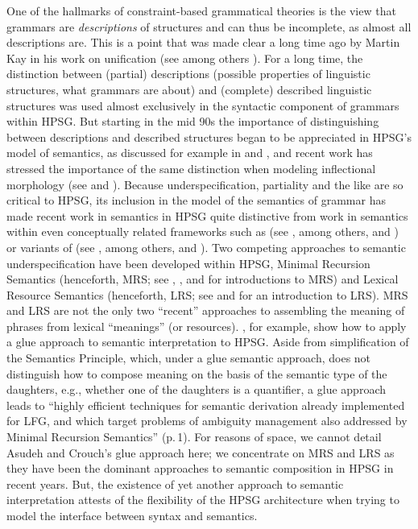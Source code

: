 \documentclass[output=paper]{langsci/langscibook}
\begin{document}
One of the hallmarks of constraint-based grammatical theories is the view that grammars are \emph{descriptions} of structures and can thus be incomplete, as almost all descriptions are. This is a point that was made clear a long time ago by Martin Kay in his work on unification (see among others \citealt{Kay1979}). For a long time, the distinction between (partial) descriptions (possible properties of linguistic structures, what grammars are about) and (complete) described linguistic structures was used almost exclusively in the syntactic component of grammars within HPSG. But starting in the mid 90s the importance of distinguishing between descriptions and described structures began to be appreciated in HPSG's model of semantics, as discussed for example in \citet{Nerbonne1993a} and \citet*{Copestakeetal1995}, and recent work has stressed the importance of the same distinction when modeling inflectional morphology (see \citealt{CrysmannandBonami2016} and ). Because underspecification, partiality and the like are so critical to HPSG, its inclusion in the model of the semantics of grammar has made recent work in semantics in HPSG quite distinctive from work in semantics within even conceptually related frameworks such as  (see \citealt{BresnanandKaplan1982b}, among others, and ) or variants of  (see \citealt{Steedman1996}, among others, and ). Two competing approaches to semantic underspecification have been developed within HPSG, Minimal Recursion Semantics (henceforth, MRS; see \citealt{Copestakeetal1995}, \citealt{Copestakeetal2001}, and \citealt{Copestakeetal2005} for introductions to MRS) and Lexical Resource Semantics (henceforth, LRS; see \citealt{RichterandSailer2001,RichterandSailer2004} and \citealt{IordachioaiaandRichter2015} for an introduction to LRS). MRS and LRS are not the only two ``recent'' approaches  to assembling the meaning of phrases from lexical ``meanings'' (or resources). \citet{AsudehandCrouch2002}, for example, show how to apply a glue approach to semantic interpretation to HPSG. Aside from simplification of the Semantics Principle, which, under a glue semantic approach, does not distinguish how to compose meaning on the basis of the semantic type of the daughters, e.g., whether one of the daughters is a quantifier, a glue approach leads to ``highly efficient techniques for semantic derivation already implemented for LFG, and which target problems of ambiguity management also addressed by Minimal Recursion Semantics'' (p.\,1). For reasons of space, we cannot detail Asudeh and Crouch's glue approach here; we concentrate on MRS and LRS as they have been the dominant approaches to semantic composition in HPSG in recent years. But, the existence of yet another approach to semantic interpretation attests of the flexibility of the HPSG architecture when trying to model the interface between syntax and semantics.
\end{document}
